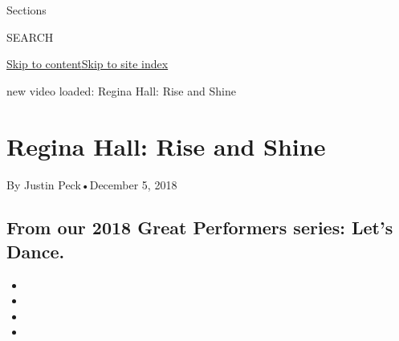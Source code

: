 Sections

SEARCH

\protect\hyperlink{site-content}{Skip to
content}\protect\hyperlink{site-index}{Skip to site index}

new video loaded: Regina Hall: Rise and Shine

\hypertarget{regina-hall-rise-and-shine}{%
\section{Regina Hall: Rise and Shine}\label{regina-hall-rise-and-shine}}

By Justin Peck•December 5, 2018

\hypertarget{from-our-2018-great-performers-series-lets-dance}{%
\subsection{From our 2018 Great Performers series: Let's
Dance.}\label{from-our-2018-great-performers-series-lets-dance}}

\begin{itemize}
\item
\item
\item
\item
\end{itemize}

